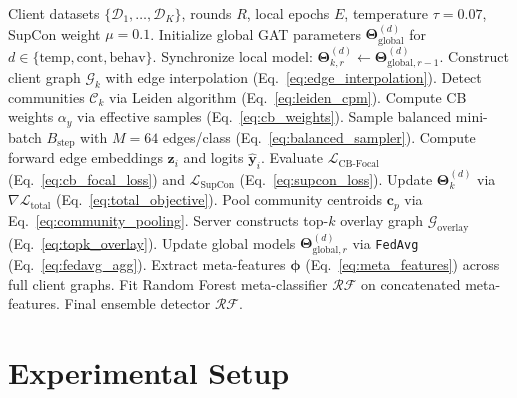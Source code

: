 \documentclass[journal,onecolumn]{IEEEtran}
\begin{document}
\begin{algorithm}[!t]
\caption{Contrastive Hybrid Federated GNN Training}
\label{alg:training_pipeline}
\begin{algorithmic}[1]
\REQUIRE Client datasets $\{\mathcal{D}_1, \dots, \mathcal{D}_K\}$, rounds $R$, local epochs $E$, temperature $\tau=0.07$, SupCon weight $\mu=0.1$.
\STATE Initialize global GAT parameters $\boldsymbol{\Theta}_{\text{global}}^{(d)}$ for $d \in \{\text{temp}, \text{cont}, \text{behav}\}$.
        \STATE Synchronize local model: $\boldsymbol{\Theta}_{k, r}^{(d)} \leftarrow \boldsymbol{\Theta}_{\text{global}, r-1}^{(d)}$.
        \STATE Construct client graph $\mathcal{G}_k$ with edge interpolation (Eq.~\ref{eq:edge_interpolation}).
        \STATE Detect communities $\mathcal{C}_k$ via Leiden algorithm (Eq.~\ref{eq:leiden_cpm}).
        \STATE Compute CB weights $\alpha_y$ via effective samples (Eq.~\ref{eq:cb_weights}).
            \STATE Sample balanced mini-batch $B_{\text{step}}$ with $M=64$ edges/class (Eq.~\ref{eq:balanced_sampler}).
            \STATE Compute forward edge embeddings $\boldsymbol{z}_i$ and logits $\hat{\boldsymbol{y}}_i$.
            \STATE Evaluate $\mathcal{L}_{\text{CB-Focal}}$ (Eq.~\ref{eq:cb_focal_loss}) and $\mathcal{L}_{\text{SupCon}}$ (Eq.~\ref{eq:supcon_loss}).
            \STATE Update $\boldsymbol{\Theta}_{k}^{(d)}$ via $\nabla \mathcal{L}_{\text{total}}$ (Eq.~\ref{eq:total_objective}).
        \ENDFOR
        \STATE Pool community centroids $\boldsymbol{c}_p$ via Eq.~\ref{eq:community_pooling}.
    \ENDFOR
    \STATE Server constructs top-$k$ overlay graph $\mathcal{G}_{\text{overlay}}$ (Eq.~\ref{eq:topk_overlay}).
    \STATE Update global models $\boldsymbol{\Theta}_{\text{global}, r}^{(d)}$ via \texttt{FedAvg} (Eq.~\ref{eq:fedavg_agg}).
\ENDFOR
\STATE Extract meta-features $\boldsymbol{\phi}$ (Eq.~\ref{eq:meta_features}) across full client graphs.
\STATE Fit Random Forest meta-classifier $\mathcal{RF}$ on concatenated meta-features.
\RETURN Final ensemble detector $\mathcal{RF}$.
\end{algorithmic}
\end{algorithm}

\section{Experimental Setup}
\label{sec:experimental_setup}
\end{document}

